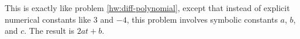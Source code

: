 This is exactly like problem \ref{hw:diff-polynomial}, except that instead of explicit
numerical constants like 3 and $-4$, this problem involves symbolic constants $a$, $b$, and
$c$. The result is $2at+b$.
